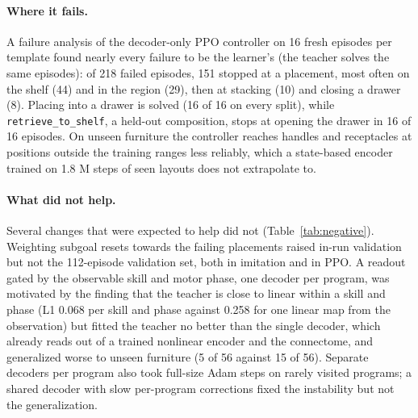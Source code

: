 \documentclass[10pt,twocolumn]{article}
\begin{document}
\paragraph{Where it fails.}
A failure analysis of the decoder-only PPO controller on 16 fresh episodes per template found nearly every failure to be the learner's (the teacher solves the same episodes): of 218 failed episodes, 151 stopped at a placement, most often on the shelf (44) and in the region (29), then at stacking (10) and closing a drawer (8).
Placing into a drawer is solved (16 of 16 on every split), while \texttt{retrieve\_to\_shelf}, a held-out composition, stops at opening the drawer in 16 of 16 episodes.
On unseen furniture the controller reaches handles and receptacles at positions outside the training ranges less reliably, which a state-based encoder trained on 1.8 M steps of seen layouts does not extrapolate to.

\paragraph{What did not help.}
Several changes that were expected to help did not (Table~\ref{tab:negative}).
Weighting subgoal resets towards the failing placements raised in-run validation but not the 112-episode validation set, both in imitation and in PPO.
A readout gated by the observable skill and motor phase, one decoder per program, was motivated by the finding that the teacher is close to linear within a skill and phase (L1 0.068 per skill and phase against 0.258 for one linear map from the observation) but fitted the teacher no better than the single decoder, which already reads out of a trained nonlinear encoder and the connectome, and generalized worse to unseen furniture (5 of 56 against 15 of 56).
Separate decoders per program also took full-size Adam steps on rarely visited programs; a shared decoder with slow per-program corrections fixed the instability but not the generalization.
\end{document}
